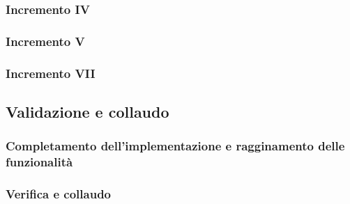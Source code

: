 \subsubsection{Incremento IV}
\subsubsection{Incremento V}
\subsubsection{Incremento VII}


\subsection{Validazione e collaudo}
\subsubsection{Completamento dell'implementazione e ragginamento delle funzionalità}
\subsubsection{Verifica e collaudo}